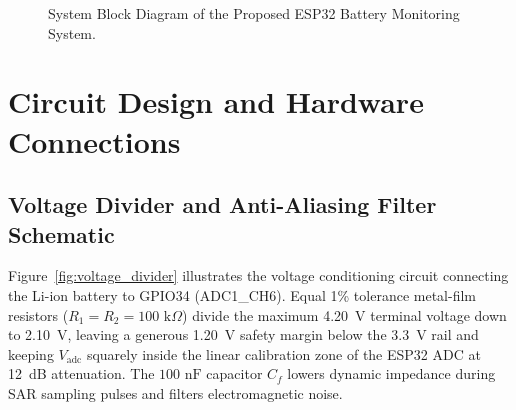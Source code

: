\documentclass[12pt,a4paper]{article}
\begin{document}
\begin{figure}[H]
{%
}
\caption{System Block Diagram of the Proposed ESP32 Battery Monitoring System.}
\label{fig:system_block}
\end{figure}

\section{Circuit Design and Hardware Connections}
\label{sec:circuit_design}

\subsection{Voltage Divider and Anti-Aliasing Filter Schematic}
Figure~\ref{fig:voltage_divider} illustrates the voltage conditioning circuit connecting the Li-ion battery to GPIO34 (ADC1\_CH6). Equal 1\% tolerance metal-film resistors ($R_1 = R_2 = 100\text{ k}\Omega$) divide the maximum 4.20~V terminal voltage down to 2.10~V, leaving a generous 1.20~V safety margin below the 3.3~V rail and keeping $V_{\text{adc}}$ squarely inside the linear calibration zone of the ESP32 ADC at 12~dB attenuation. The $100\text{ nF}$ capacitor $C_f$ lowers dynamic impedance during SAR sampling pulses and filters electromagnetic noise.
\end{document}
